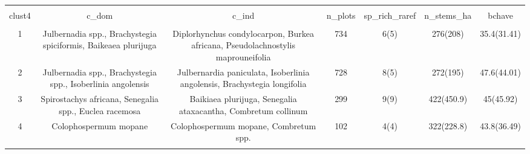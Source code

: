
\begin{table}[!htbp] \centering 
  \caption{} 
  \label{clust_summ} 
\begin{tabular}{@{\extracolsep{5pt}} ccccccc} 
\\[-1.8ex]\hline 
\hline \\[-1.8ex] 
clust4 & c\_dom & c\_ind & n\_plots & sp\_rich\_raref & n\_stems\_ha & bchave \\ 
\hline \\[-1.8ex] 
1 & Julbernadia spp., Brachystegia spiciformis, Baikeaea plurijuga & Diplorhynchus condylocarpon, Burkea africana, Pseudolachnostylis maprouneifolia & 734 & 6(5) & 276(208) & 35.4(31.41) \\ 
2 & Julbernadia spp., Brachystegia spp., Isoberlinia angolensis & Julbernardia paniculata, Isoberlinia angolensis, Brachystegia longifolia & 728 & 8(5) & 272(195) & 47.6(44.01) \\ 
3 & Spirostachys africana, Senegalia spp., Euclea racemosa & Baikiaea plurijuga, Senegalia ataxacantha, Combretum collinum & 299 & 9(9) & 422(450.9) & 45(45.92) \\ 
4 & Colophospermum mopane & Colophospermum mopane, Combretum spp. & 102 & 4(4) & 322(228.8) & 43.8(36.49) \\ 
\hline \\[-1.8ex] 
\end{tabular} 
\end{table} 
